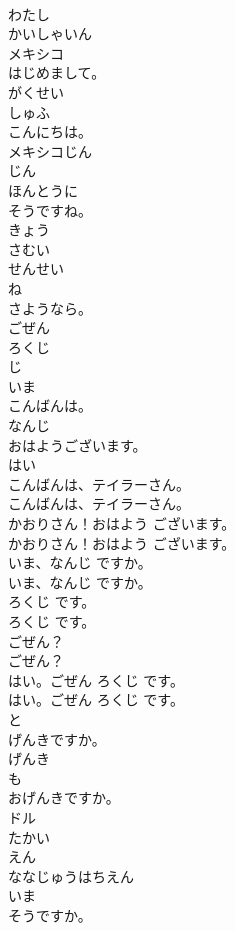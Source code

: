\documentclass[8pt]{extreport}
\begin{document}
\begin{CJK}{UTF8}{min}
\\	わたし
\\	かいしゃいん
\\	メキシコ
\\	はじめまして。
\\	がくせい
\\	しゅふ
\\	こんにちは。
\\	メキシコじん
\\	じん
\\	ほんとうに
\\	そうですね。
\\	きょう
\\	さむい
\\	せんせい
\\	ね
\\	さようなら。
\\	ごぜん
\\	ろくじ
\\	じ
\\	いま
\\	こんばんは。
\\	なんじ
\\	おはようございます。
\\	はい
\\	こんばんは、テイラーさん。	
\\	こんばんは、テイラーさん。 
\\	かおりさん！おはよう ございます。	
\\	かおりさん！おはよう ございます。 
\\	いま、なんじ ですか。	
\\	いま、なんじ ですか。 
\\	ろくじ です。	
\\	ろくじ です。 
\\	ごぜん？	
\\	ごぜん？ 
\\	はい。ごぜん ろくじ です。	
\\	はい。ごぜん ろくじ です。 
\\	と
\\	げんきですか。
\\	げんき
\\	も
\\	おげんきですか。
\\	ドル
\\	たかい
\\	えん
\\	ななじゅうはちえん
\\	いま
\\	そうですか。

\end{CJK}
\end{document}
